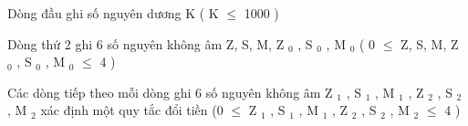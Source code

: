 Dòng đầu ghi số nguyên dương K ( K  $\le$  1000 )

Dòng thứ 2 ghi 6 số nguyên không âm Z, S, M, Z $_ 0 $ , S $_ 0 $ , M $_ 0 $ ( 0  $\le$  Z, S, M, Z $_ 0 $ , S $_ 0 $ , M $_ 0 $  $\le$  4 )

Các dòng tiếp theo mỗi dòng ghi 6 số nguyên không âm Z $_ 1 $ , S $_ 1 $ , M $_ 1 $ , Z $_ 2 $ , S $_ 2 $ , M $_ 2 $ xác định một quy tắc đổi tiền (0  $\le$  Z $_ 1 $ , S $_ 1 $ , M $_ 1 $ , Z $_ 2 $ , S $_ 2 $ , M $_ 2 $  $\le$  4 )